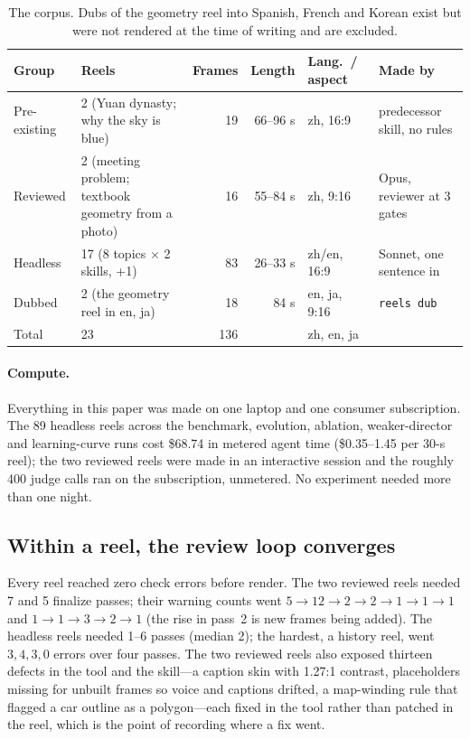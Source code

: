 \documentclass[11pt]{article}
\begin{document}
\begin{table}[t]
\centering\small
\begin{tabular}{lp{4.3cm}rrlp{3.4cm}}
\toprule
Group & Reels & Frames & Length & Lang.\ / aspect & Made by \\
\midrule
Pre-existing & 2 (Yuan dynasty; why the sky is blue) & 19 & 66--96 s & zh, 16:9 & predecessor skill, no rules \\
Reviewed & 2 (meeting problem; textbook geometry from a photo) & 16 & 55--84 s & zh, 9:16 & Opus, reviewer at 3 gates \\
Headless & 17 (8 topics $\times$ 2 skills, +1) & 83 & 26--33 s & zh/en, 16:9 & Sonnet, one sentence in \\
Dubbed & 2 (the geometry reel in en, ja) & 18 & 84 s & en, ja, 9:16 & \texttt{reels dub} \\
\midrule
Total & 23 & 136 & & zh, en, ja & \\
\bottomrule
\end{tabular}
\caption{The corpus. Dubs of the geometry reel into Spanish, French and Korean exist but were not
rendered at the time of writing and are excluded.}
\label{tab:corpus}
\end{table}

\paragraph{Compute.} Everything in this paper was made on one laptop and one consumer subscription.
The 89 headless reels across the benchmark, evolution, ablation, weaker-director and learning-curve
runs cost \$68.74 in metered agent time (\$0.35--1.45 per 30-s reel); the two reviewed reels were made
in an interactive session and the roughly 400 judge calls ran on the subscription, unmetered. No
experiment needed more than one night.

\subsection{Within a reel, the review loop converges}
Every reel reached zero check errors before render. The two reviewed reels needed 7 and 5 finalize
passes; their warning counts went $5 \rightarrow 12 \rightarrow 2 \rightarrow 2 \rightarrow 1
\rightarrow 1 \rightarrow 1$ and $1 \rightarrow 1 \rightarrow 3 \rightarrow 2 \rightarrow 1$ (the rise
in pass~2 is new frames being added). The headless reels needed 1--6 passes (median 2); the hardest,
a history reel, went $3, 4, 3, 0$ errors over four passes. The two reviewed reels also exposed
thirteen defects in the tool and the skill---a caption skin with 1.27:1 contrast, placeholders
missing for unbuilt frames so voice and captions drifted, a map-winding rule that flagged a car
outline as a polygon---each fixed in the tool rather than patched in the reel, which is the point of recording where a fix went.
\end{document}
